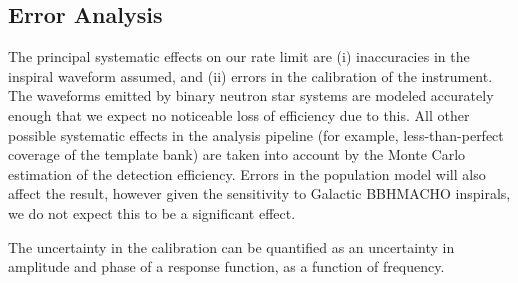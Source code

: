 \subsection{Error Analysis}
\label{ss:errors}

The principal systematic effects on our rate limit are (i) inaccuracies in the
inspiral waveform assumed, and (ii) errors in the calibration of the
instrument.  The waveforms emitted by binary neutron star systems are modeled
accurately enough that we expect no noticeable loss of efficiency due to this.
All other possible systematic effects in the analysis pipeline (for example,
less-than-perfect coverage of the template bank) are taken into account by the
Monte Carlo estimation of the detection efficiency.  Errors in the population
model will also affect the result, however given the sensitivity to Galactic
BBHMACHO inspirals, we do not expect this to be a significant effect.

The uncertainty in the calibration can be quantified as an uncertainty in
amplitude and phase of a response function, as a function of frequency.



\newpage

